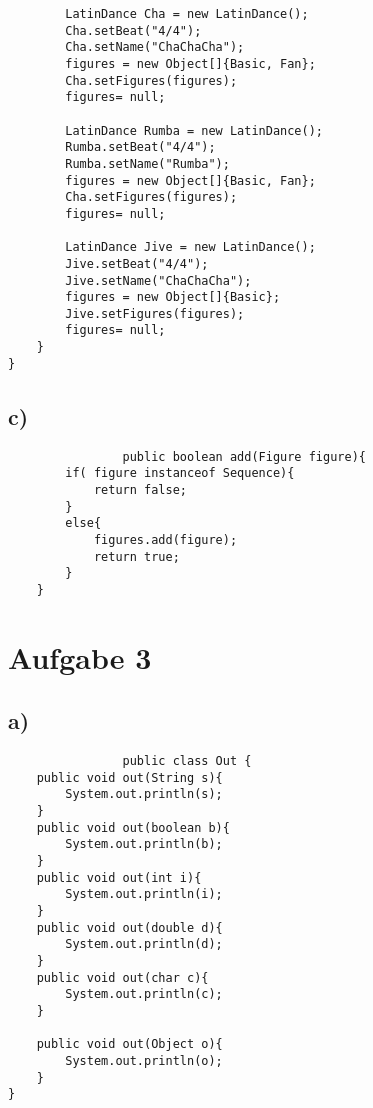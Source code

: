 \documentclass[12pt,a4paper,oneside,ngerman]{article}
\begin{document}
\begin{verbatim}
        LatinDance Cha = new LatinDance();
        Cha.setBeat("4/4");
        Cha.setName("ChaChaCha");
        figures = new Object[]{Basic, Fan};
        Cha.setFigures(figures);
        figures= null;

        LatinDance Rumba = new LatinDance();
        Rumba.setBeat("4/4");
        Rumba.setName("Rumba");
        figures = new Object[]{Basic, Fan};
        Cha.setFigures(figures);
        figures= null;

        LatinDance Jive = new LatinDance();
        Jive.setBeat("4/4");
        Jive.setName("ChaChaCha");
        figures = new Object[]{Basic};
        Jive.setFigures(figures);
        figures= null;
    }
}

					\end{verbatim}
			\subsection{c)}
			\begin{verbatim}
				public boolean add(Figure figure){
        if( figure instanceof Sequence){
            return false;
        }
        else{
            figures.add(figure);
            return true;
        }
    }
			\end{verbatim}
	\section{Aufgabe 3}
			\subsection{a)}
			\begin{verbatim}
				public class Out {
    public void out(String s){
        System.out.println(s);
    }
    public void out(boolean b){
        System.out.println(b);
    }
    public void out(int i){
        System.out.println(i);
    }
    public void out(double d){
        System.out.println(d);
    }
    public void out(char c){
        System.out.println(c);
    }

    public void out(Object o){
        System.out.println(o);
    }
}
			\end{verbatim}
\end{document}
